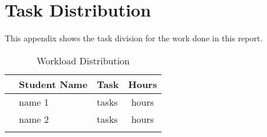\chapter{Task Distribution}
\label{app:task distribution}

This appendix shows the task division for the work done in this report.

\setlength\extrarowheight{4pt}
\begin{table}[H]
    \centering
    \small
    \caption{Workload Distribution}
    \begin{tabularx}{\textwidth}{llXc}
        \toprule
        & Student Name & Task & Hours\\
        \midrule
        & name 1 & tasks & hours \\ 
        & name 2 & tasks & hours \\
        \midrule
        & & \\
        \bottomrule
    \end{tabularx}
    \label{tab:task distribution}
\end{table}
